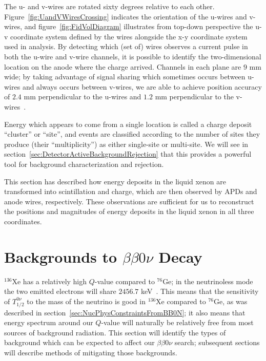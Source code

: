 The u- and v-wires are rotated sixty degrees relative to each other.  Figure~\ref{fig:UandVWiresCrossing} indicates the orientation of the u-wires and v-wires, and figure~\ref{fig:FidVolDiagram} illustrates from top-down perspective the u-v coordinate system defined by the wires alongside the x-y coordinate system used in analysis.  By detecting which (set of) wires observes a current pulse in both the u-wire and v-wire channels, it is possible to identify the two-dimensional location on the anode where the charge arrived.  Channels in each plane are $9$ mm wide; by taking advantage of signal sharing which sometimes occurs between u-wires and always occurs between v-wires, we are able to achieve position accuracy of $2.4$ mm perpendicular to the u-wires and $1.2$ mm perpendicular to the v-wires~\cite{bb2nEXO2014}.

Energy which appears to come from a single location is called a charge deposit ``cluster'' or ``site'', and events are classified according to the number of sites they produce (their ``multiplicity'') as either single-site or multi-site.  We will see in section~\ref{sec:DetectorActiveBackgroundRejection} that this provides a powerful tool for background characterization and rejection.

This section has described how energy deposits in the liquid xenon are transformed into scintillation and charge, which are then observed by APDs and anode wires, respectively.  These observations are sufficient for us to reconstruct the positions and magnitudes of energy deposits in the liquid xenon in all three coordinates.

\section{Backgrounds to \texorpdfstring{$\beta\beta 0\nu$}{Neutrinoless Double-Beta} Decay}\label{sec:DetectorBackgrounds}

$^{136}$Xe has a relatively high $Q$-value compared to $^{76}$Ge; in the neutrinoless mode the two emitted electrons will share $2456.7$ keV~\cite{NewEXObb0nPaper_2014}.  This means that the sensitivity of $T_{1/2}^{0\nu}$ to the mass of the neutrino is good in $^{136}$Xe compared to $^{76}$Ge, as was described in section~\ref{sec:NucPhysConstraintsFromBB0N}; it also means that energy spectrum around our $Q$-value will naturally be relatively free from most sources of background radiation.  This section will identify the types of background which can be expected to affect our $\beta\beta 0\nu$ search; subsequent sections will describe methods of mitigating those backgrounds.

